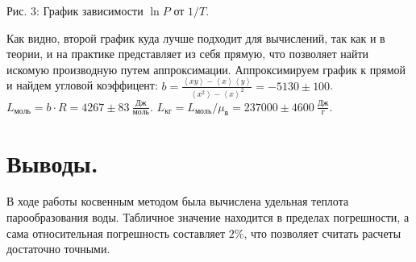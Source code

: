\documentclass[a4paper,11pt]{article}
\begin{document}
\begin{center}
\newline
Рис. 3: График зависимости $\ln P$ от $1/T$.\newline
\end{center}
Как видно, второй график куда лучше подходит для вычислений, так как и в теории, и на практике представляет из себя прямую, что позволяет найти искомую производную путем аппроксимации. Аппроксимируем график к прямой и найдем угловой коэффицент:\newline
$b = \frac{ \left< xy \right> - \left< x \right> \left< y \right> }{ \left< x^{2} \right> - \left< x \right>^{2} } = -5130 \pm 100$.\newline
$L_{моль} = b \cdot R = 4267 \pm 83\ \frac{Дж}{моль}$.\newline
$L_{кг} = L_{моль} / \mu_{в} = 237000 \pm 4600 \ \frac{Дж}{г}$.
\section{Выводы.}
В ходе работы косвенным методом была вычислена удельная теплота парообразования воды. Табличное значение находится в пределах погрешности, а сама относительная погрешность составляет $2\%$, что позволяет считать расчеты достаточно точными.
\end{document}
